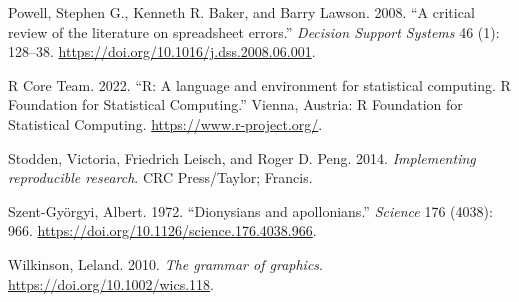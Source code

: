 \documentclass[smallextended]{svjour3}       %
\newlength{\cslhangindent}
\newlength{\cslentryspacingunit} %
\newenvironment{CSLReferences}[2] %
 {%
  \setlength{\parindent}{0pt}
  \ifodd #1
  \let\oldpar\par
  \def\par{\hangindent=\cslhangindent\oldpar}
  \fi
  \setlength{\parskip}{#2\cslentryspacingunit}
 }%
 {}
\begin{document}
\begin{CSLReferences}{1}{0}
\leavevmode{}%
Powell, Stephen G., Kenneth R. Baker, and Barry Lawson. 2008. {``{A critical review of the literature on spreadsheet errors}.''} \emph{Decision Support Systems} 46 (1): 128--38. \url{https://doi.org/10.1016/j.dss.2008.06.001}.

\leavevmode{}%
R Core Team. 2022. {``{R: A language and environment for statistical computing. R Foundation for Statistical Computing}.''} Vienna, Austria: R Foundation for Statistical Computing. \url{https://www.r-project.org/}.

\leavevmode{}%
Stodden, Victoria, Friedrich Leisch, and Roger D. Peng. 2014. \emph{{Implementing reproducible research}}. CRC Press/Taylor; Francis.

\leavevmode{}%
Szent-Györgyi, Albert. 1972. {``{Dionysians and apollonians}.''} \emph{Science} 176 (4038): 966. \url{https://doi.org/10.1126/science.176.4038.966}.

\leavevmode{}%
Wilkinson, Leland. 2010. \emph{{The grammar of graphics}}. \url{https://doi.org/10.1002/wics.118}.

\end{CSLReferences}




\end{document}
